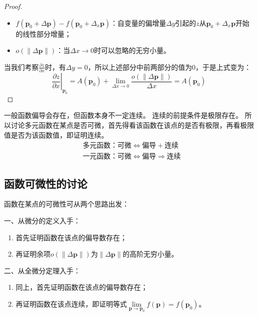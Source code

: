 \begin{proof}
\begin{itemize}
    \item $f\left( \boldsymbol{p}_0+\Delta \boldsymbol{p} \right) -f\left( \boldsymbol{p}_0+\Delta _x\boldsymbol{p} \right) $：自变量的偏增量$\Delta y$引起的$z$从$\boldsymbol{p}_0+\Delta _x\boldsymbol{p}$开始的线性部分增量；
    \item $o\left( \left\| \Delta \boldsymbol{p} \right\| \right) $：当$\Delta x\rightarrow 0$时可以忽略的无穷小量。
\end{itemize}
当我们考察$\frac{\partial z}{\partial x}$时，有$\Delta y=0$，所以上述部分中前两部分的值为0，于是上式变为：
\[
\left. \frac{\partial z}{\partial x} \right|_{\boldsymbol{p}_0}=A\left( \boldsymbol{p}_0 \right) +\underset{\Delta x\rightarrow 0}{\lim}\frac{o\left( \left\| \Delta \boldsymbol{p} \right\| \right)}{\Delta x}=A\left( \boldsymbol{p}_0 \right)
\]
\end{proof}

一般函数偏导会存在，但函数本身不一定连续。
连续的前提条件是极限存在。
所以讨论多元函数在某点是否可微，首先得看该函数在该点的是否有极限，再看极限值是否为该函数值，即证明连续。
\begin{align*}
&\text{多元函数：可微} \Leftrightarrow \text{偏导} + \text{连续} \\
&\text{一元函数：可微} \Leftrightarrow \text{偏导} \Rightarrow \text{连续}
\end{align*}

\subsection{函数可微性的讨论}

函数在某点的可微性可从两个思路出发：

一、从微分的定义入手：
\begin{enumerate}
    \item 首先证明函数在该点的偏导数存在；
    \item 再证明余项$o\left( \left\| \Delta \boldsymbol{p} \right\| \right) $为$\left\| \Delta \boldsymbol{p} \right\| $的高阶无穷小量。
\end{enumerate}

二、从全微分定理入手：
\begin{enumerate}
    \item 同上，首先证明函数在该点的偏导数存在；
    \item 再证明函数在该点连续，即证明等式$\underset{\boldsymbol{p}\rightarrow \boldsymbol{p}_0}{\lim}f\left( \boldsymbol{p} \right) =f\left( \boldsymbol{p}_0 \right) $。
\end{enumerate}

